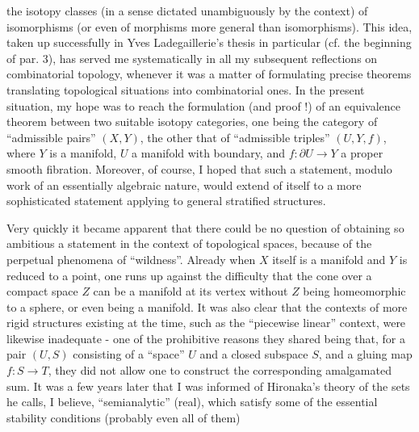 
the isotopy classes (in a sense dictated unambiguously by the
context) of isomorphisms (or even of morphisms more general
than isomorphisms). This idea, taken up successfully
in Yves Ladegaillerie's thesis in particular (cf. the beginning of par. 3),
has served me systematically in all my subsequent reflections
on combinatorial topology, whenever it was a matter of formulating
precise theorems translating topological situations
into combinatorial ones. In the present situation,
my hope was to reach the formulation (and proof !)
of an equivalence theorem between two suitable isotopy categories,
one being the category of ``admissible pairs'' $(X,Y)$,
the other that of ``admissible triples'' $(U,Y,f)$, where $Y$ is a
manifold, $U$ a manifold with boundary, and $f : \partial U \longrightarrow Y$ a proper
smooth fibration. Moreover, of course, I hoped that such a statement,
modulo work of an essentially algebraic nature, would
extend of itself to a more sophisticated statement applying to
general stratified structures.

Very quickly it became apparent that there could be no question
of obtaining so ambitious a statement in the context of
topological spaces, because of the perpetual phenomena of
``wildness''. Already when $X$ itself is a manifold and $Y$ is
reduced to a point, one runs up against the difficulty that the cone over
a compact space $Z$ can be a manifold at its vertex without
$Z$ being homeomorphic to a sphere, or even being a manifold. It
was also clear that the contexts of more rigid structures
existing at the time, such as the ``piecewise linear'' context,
were likewise inadequate - one of the prohibitive reasons they
shared being that, for a pair $(U,S)$ consisting of a
``space'' $U$ and a closed subspace $S$, and a gluing
map $f : S \longrightarrow T$, they did not allow one to construct the corresponding
amalgamated sum. It was a few years later that I was informed
of Hironaka's theory of the sets he calls, I believe,
``semianalytic'' (real), which satisfy some of the essential
stability conditions (probably even all of them)


